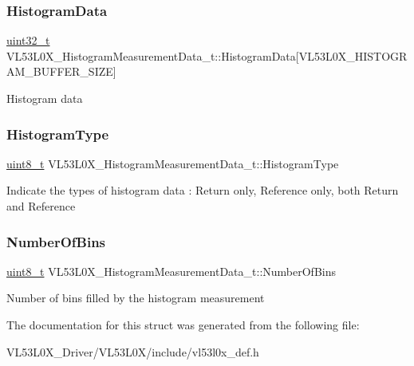 \subsubsection{\texorpdfstring{Histogram\+Data}{HistogramData}}
{\footnotesize\ttfamily \hyperlink{vl53l0x__types_8h_a435d1572bf3f880d55459d9805097f62}{uint32\+\_\+t} V\+L53\+L0\+X\+\_\+\+Histogram\+Measurement\+Data\+\_\+t\+::\+Histogram\+Data\mbox{[}V\+L53\+L0\+X\+\_\+\+H\+I\+S\+T\+O\+G\+R\+A\+M\+\_\+\+B\+U\+F\+F\+E\+R\+\_\+\+S\+I\+ZE\mbox{]}}

Histogram data \mbox{\label{structVL53L0X__HistogramMeasurementData__t_a713133c2139609ef810ebe5f38cf2f8a}} 
\subsubsection{\texorpdfstring{Histogram\+Type}{HistogramType}}
{\footnotesize\ttfamily \hyperlink{vl53l0x__types_8h_aba7bc1797add20fe3efdf37ced1182c5}{uint8\+\_\+t} V\+L53\+L0\+X\+\_\+\+Histogram\+Measurement\+Data\+\_\+t\+::\+Histogram\+Type}

Indicate the types of histogram data \+: Return only, Reference only, both Return and Reference \mbox{\label{structVL53L0X__HistogramMeasurementData__t_a6e0891ab8446212c6c6325fb6a183450}} 
\subsubsection{\texorpdfstring{Number\+Of\+Bins}{NumberOfBins}}
{\footnotesize\ttfamily \hyperlink{vl53l0x__types_8h_aba7bc1797add20fe3efdf37ced1182c5}{uint8\+\_\+t} V\+L53\+L0\+X\+\_\+\+Histogram\+Measurement\+Data\+\_\+t\+::\+Number\+Of\+Bins}

Number of bins filled by the histogram measurement 

The documentation for this struct was generated from the following file\+:\begin{DoxyCompactItemize}
\item 
V\+L53\+L0\+X\+\_\+\+Driver/\+V\+L53\+L0\+X/include/vl53l0x\+\_\+def.\+h\end{DoxyCompactItemize}
